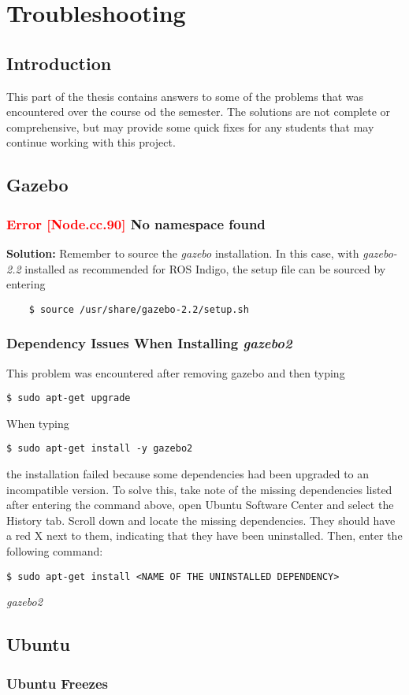 \chapter{Troubleshooting}

\section{Introduction}

This part of the thesis contains answers to some of the problems that was encountered over the course od the semester. The solutions are not complete or comprehensive, but may provide some quick fixes for any students that may continue working with this project.

\section{Gazebo}

\subsection{\textcolor{red}{Error [Node.cc.90]} No namespace found}

\textbf{Solution: } Remember to source the \textit{gazebo} installation. In this case, with \textit{gazebo-2.2} installed as recommended for \ac{ROS} Indigo, the setup file can be sourced by entering

\begin{verbatim}
	$ source /usr/share/gazebo-2.2/setup.sh
\end{verbatim}

\subsection{Dependency Issues When Installing \textit{gazebo2}}

This problem was encountered after removing gazebo and then typing

\begin{verbatim}
$ sudo apt-get upgrade
\end{verbatim}

When typing 

\begin{verbatim}
$ sudo apt-get install -y gazebo2
\end{verbatim}

the installation failed because some dependencies had been upgraded to an incompatible version. To solve this, take note of the missing dependencies listed after entering the command above, open Ubuntu Software Center and select the History tab. Scroll down and locate the missing dependencies. They should have a red X next to them, indicating that they have been uninstalled. Then, enter the following command:

\begin{verbatim}
$ sudo apt-get install <NAME OF THE UNINSTALLED DEPENDENCY>
\end{verbatim}

\textit{gazebo2} 

\section{Ubuntu}

\subsection{Ubuntu Freezes}

\cite{Reboot_Ubuntu}